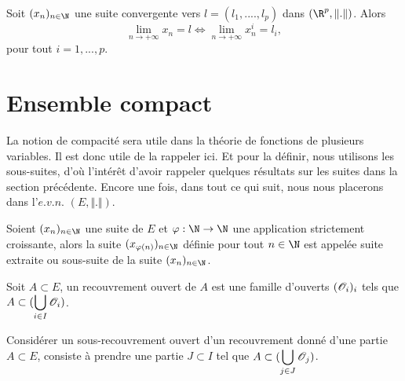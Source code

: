 \documentclass[class=report,crop=false]{standalone}
\begin{document}
\begin{proposition}
\textcolor[rgb]{0.50,0.00,0.25}{ 
Soit $(x_n)_{n\in \N}$ une suite convergente vers $l=(l_1,....,l_p)$ dans $(\R^p, \Vert . \Vert)$. Alors
\begin{equation*}
\displaystyle \lim_{n \rightarrow +\infty} x_n=l \Longleftrightarrow \displaystyle \lim_{n \rightarrow +\infty} x_n^i=l_i,
\end{equation*}
pour tout $i=1,...,p$.
}
\end{proposition}



 
 \section{Ensemble compact}\label{compacite}
 
 \noindent La notion de compacité sera utile dans la théorie de fonctions de plusieurs
 variables. Il est donc utile de la rappeler ici. Et pour la définir, nous utilisons les sous-suites, d'où l'intérêt d'avoir rappeler quelques résultats
 sur les suites dans la section précédente. Encore une fois, dans tout ce qui suit, nous nous placerons dans l'$e.v.n.$ 
 $(E, \Vert . \Vert)$.
 
 \begin{definition} 
\textcolor[rgb]{0.73,0.00,0.00}{
\noindent Soient $(x_n)_{n \in \N}$ une suite de $E$ et $\varphi: \N \rightarrow \N$
une application strictement croissante, alors la suite $(x_{\varphi(n)})_{n \in \N}$ définie
pour tout $n \in \N$ est appelée suite extraite
ou sous-suite de la suite $(x_n)_{n \in \N}$.
}
\end{definition}

 
 
\begin{definition}
\textcolor[rgb]{0.73,0.00,0.00}{
\noindent Soit $A \subset E$,  un recouvrement ouvert de $A$ est une famille 
d'ouverts $(\mathscr{O}_i)_i$ tels que $A \subset (\displaystyle \bigcup_{i \in I} \mathscr{O} _i)$.
}
\end{definition}

  
 
\begin{definition}
\textcolor[rgb]{0.73,0.00,0.00}{
\noindent Considérer un sous-recouvrement ouvert d'un recouvrement donné d'une partie $A \subset E$, consiste à prendre une partie
$J \subset I$ tel que  $A \subset (\displaystyle \bigcup_{j \in J} \mathscr{O} _j)$.
}
\end{definition}
\end{document}
